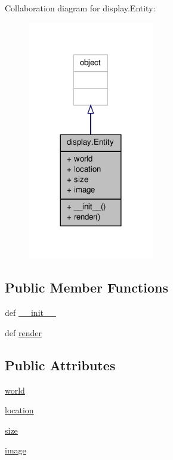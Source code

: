 Collaboration diagram for display.\+Entity\+:\nopagebreak
\begin{figure}[H]
\begin{center}
\leavevmode
\includegraphics[width=156pt]{classdisplay_1_1Entity__coll__graph}
\end{center}
\end{figure}
\subsection*{Public Member Functions}
\begin{DoxyCompactItemize}
\item 
def \hyperlink{classdisplay_1_1Entity_a10294b5b8a8fa95f95f29aaf521efd56}{\+\_\+\+\_\+init\+\_\+\+\_\+}
\item 
def \hyperlink{classdisplay_1_1Entity_abbea5f77f08ce3347010d9c452440737}{render}
\end{DoxyCompactItemize}
\subsection*{Public Attributes}
\begin{DoxyCompactItemize}
\item 
\hyperlink{classdisplay_1_1Entity_ad7e3284bfb984c309b35d5a077bd5b21}{world}
\item 
\hyperlink{classdisplay_1_1Entity_ae2a1114b0c54ef7eb43c2bd6cd097258}{location}
\item 
\hyperlink{classdisplay_1_1Entity_aa56fd9b8bb6c9510f24ea13be8c6a218}{size}
\item 
\hyperlink{classdisplay_1_1Entity_a244569c285ad924e6200d4c1c8b4639c}{image}
\end{DoxyCompactItemize}



